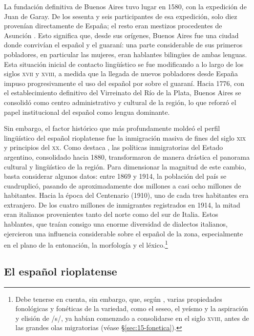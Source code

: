 La fundación definitiva de Buenos Aires tuvo lugar en 1580, con la expedición de
Juan de Garay. De los sesenta y seis participantes de esa expedición, solo diez
provenían directamente de España; el resto eran mestizos procedentes de Asunción
\parencite{fontanella1987}. Esto significa que, desde sus orígenes, Buenos Aires
fue una ciudad donde convivían el español y el guaraní: una parte considerable de
sus primeros pobladores, en particular las mujeres, eran hablantes bilingües de
ambas lenguas. Esta situación inicial de contacto lingüístico se fue modificando
a lo largo de los siglos \textsc{xvii} y \textsc{xviii}, a medida que la llegada
de nuevos pobladores desde España impuso progresivamente el uso del español por
sobre el guaraní. Hacia 1776, con el establecimiento definitivo del Virreinato
del Río de la Plata, Buenos Aires se consolidó como centro administrativo y
cultural de la región, lo que reforzó el papel institucional del español como
lengua dominante.

Sin embargo, el factor histórico que más profundamente moldeó el perfil
lingüístico del español rioplatense fue la inmigración masiva de fines del siglo
\textsc{xix} y principios del \textsc{xx}. Como destaca
\textcite{ditullio2010a}, las políticas inmigratorias del Estado argentino,
consolidado hacia 1880, transformaron de manera drástica el panorama cultural y
lingüístico de la región. Para dimensionar la magnitud de este cambio, basta
considerar algunos datos: entre 1869 y 1914, la población del país se
cuadruplicó, pasando de aproximadamente dos millones a casi ocho millones de
habitantes. Hacia la época del Centenario (1910), uno de cada tres habitantes era
extranjero. De los cuatro millones de inmigrantes registrados en 1914, la mitad
eran italianos provenientes tanto del norte como del sur de Italia. Estos
hablantes, que traían consigo una enorme diversidad de dialectos italianos,
ejercieron una influencia considerable sobre el español de la zona,
especialmente en el plano de la entonación, la morfología y el
léxico.\footnote{Debe tenerse en cuenta, sin embargo, que, según
\textcite[94]{fontanella1987}, varias propiedades fonológicas y fonéticas de la
variedad, como el seseo, el yeísmo y la aspiración y elisión de /s/, ya habían
comenzado a consolidarse en el siglo \textsc{xviii}, antes de las grandes olas
migratorias (véase §\ref{sec:15-fonetica}).}

\subsection{El español rioplatense}\label{sec:15-rioplatense}

